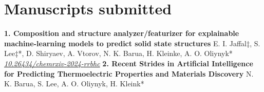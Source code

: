 \documentclass{article}%
\begin{document}
\section*{Manuscripts submitted}%
\label{sec:Manuscriptssubmitted}%
\textbf{1. Composition and structure analyzer/featurizer for explainable machine{-}learning models to predict solid state structures\newline%
}%
E. I. Jaffal‡, S. Lee‡*, D. Shiryaev, A. Vtorov, N. K. Barua, H. Kleinke, A. O. Oliynyk*\newline%
%
\href{https://doi.org/10.26434/chemrxiv-2024-rrbhc}{\textit{10.26434/chemrxiv{-}2024{-}rrbhc}}%
\newline%
\newline%
%
\textbf{2. Recent Strides in Artificial Intelligence for Predicting Thermoelectric Properties and Materials Discovery\newline%
}%
N. K. Barua, S. Lee, A. O. Oliynyk, H. Kleink*\newline%
%

%
\end{document}
